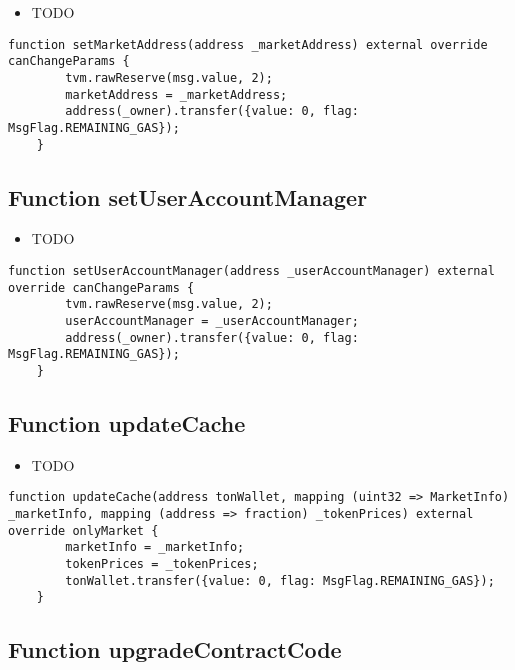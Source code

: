 \noindent\begin{itemize}
\item TODO
\end{itemize}

\begin{lstlisting}[firstnumber=65]
    function setMarketAddress(address _marketAddress) external override canChangeParams {
        tvm.rawReserve(msg.value, 2);
        marketAddress = _marketAddress;
        address(_owner).transfer({value: 0, flag: MsgFlag.REMAINING_GAS});
    }
\end{lstlisting}

\subsection{Function setUserAccountManager}

\noindent\begin{itemize}
\item TODO
\end{itemize}

\begin{lstlisting}[firstnumber=71]
    function setUserAccountManager(address _userAccountManager) external override canChangeParams {
        tvm.rawReserve(msg.value, 2);
        userAccountManager = _userAccountManager;
        address(_owner).transfer({value: 0, flag: MsgFlag.REMAINING_GAS});
    }
\end{lstlisting}

\subsection{Function updateCache}

\noindent\begin{itemize}
\item TODO
\end{itemize}

\begin{lstlisting}[firstnumber=81]
    function updateCache(address tonWallet, mapping (uint32 => MarketInfo) _marketInfo, mapping (address => fraction) _tokenPrices) external override onlyMarket {
        marketInfo = _marketInfo;
        tokenPrices = _tokenPrices;
        tonWallet.transfer({value: 0, flag: MsgFlag.REMAINING_GAS});
    }
\end{lstlisting}

\subsection{Function upgradeContractCode}

